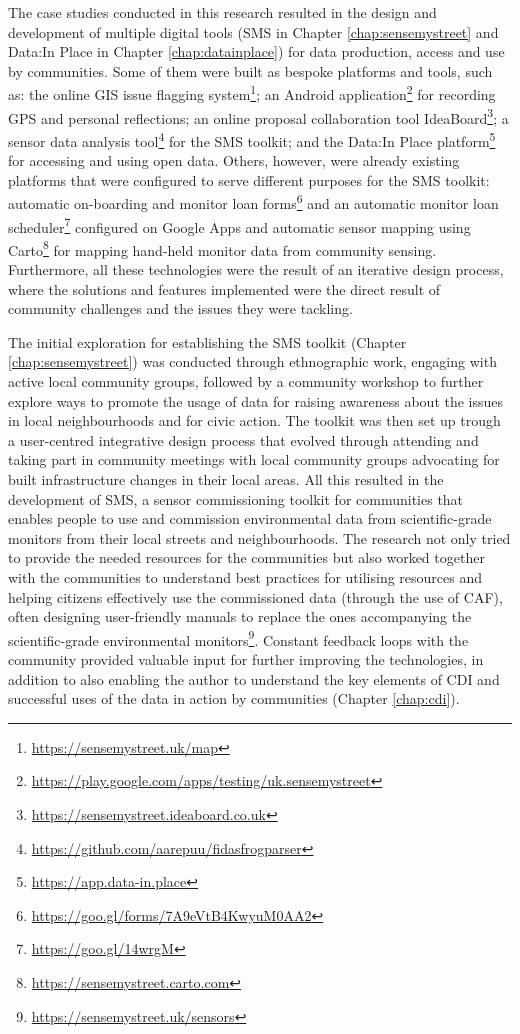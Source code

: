 The case studies conducted in this research resulted in the design and development of multiple digital tools (SMS in Chapter \ref{chap:sensemystreet} and Data:In Place in Chapter \ref{chap:datainplace}) for data production, access and use by communities. Some of them were built as bespoke platforms and tools, such as: the online GIS issue flagging system\footnote{\url{https://sensemystreet.uk/map}}; an Android application\footnote{\url{https://play.google.com/apps/testing/uk.sensemystreet}} for recording GPS and personal reflections; an online proposal collaboration tool IdeaBoard\footnote{\url{https://sensemystreet.ideaboard.co.uk}}; a sensor data analysis tool\footnote{\url{https://github.com/aarepuu/fidasfrogparser}} for the SMS toolkit; and the Data:In Place platform\footnote{\url{https://app.data-in.place}} for accessing and using open data. Others, however, were already existing platforms that were configured to serve different purposes for the SMS toolkit: automatic on-boarding and monitor loan forms\footnote{\url{https://goo.gl/forms/7A9eVtB4KwyuM0AA2}} and an automatic monitor loan scheduler\footnote{\url{https://goo.gl/14wrgM}} configured on Google Apps and automatic sensor mapping using Carto\footnote{\url{https://sensemystreet.carto.com}} for mapping hand-held monitor data from community sensing. Furthermore, all these technologies were the result of an iterative design process, where the solutions and features implemented were the direct result of community challenges and the issues they were tackling.

The initial exploration for establishing the SMS toolkit (Chapter \ref{chap:sensemystreet}) was conducted through ethnographic work, engaging with active local community groups, followed by a community workshop to further explore ways to promote the usage of data for raising awareness about the issues in local neighbourhoods and for civic action. The toolkit was then set up trough a user-centred integrative design process that evolved through attending and taking part in community meetings with local community groups advocating for built infrastructure changes in their local areas. All this resulted in the development of SMS, a sensor commissioning toolkit for communities that enables people to use and commission environmental data from scientific-grade monitors from their local streets and neighbourhoods. The research not only tried to provide the needed resources for the communities but also worked together with the communities to understand best practices for utilising resources and helping citizens effectively use the commissioned data (through the use of CAF), often designing user-friendly manuals to replace the ones accompanying the scientific-grade environmental monitors\footnote{\url{https://sensemystreet.uk/sensors}}. Constant feedback loops with the community provided valuable input for further improving the technologies, in addition to also enabling the author to understand the key elements of CDI and successful uses of the data in action by communities (Chapter \ref{chap:cdi}).

